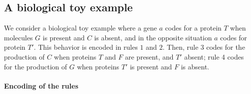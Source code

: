 \subsection{A  biological toy example}\label{subsec:toy}

\noindent
We consider a biological toy example where a gene $a$  codes for a protein $T$ when molecules 
$G$ is present and $C$ is absent, and in the opposite situation $a$ codes for protein $T'$.
This behavior is encoded in rules $1$ and $2$.
Then, rule 3 codes for the production of $C$ when proteins $T$ and $F$ are present, and $T'$ absent;
rule 4 codes for the production of $G$ when  proteins $T'$ is present and $F$ is absent.

\paragraph{Encoding of the rules}

